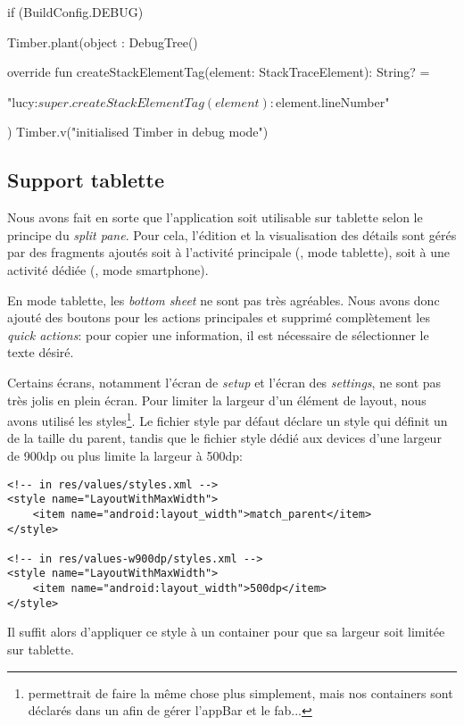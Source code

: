 \begin{kotlincode}
if (BuildConfig.DEBUG) {
    Timber.plant(object : DebugTree() {
        override fun createStackElementTag(element: StackTraceElement): String? =

        "lucy:${super.createStackElementTag(element)}:${element.lineNumber}"
    })
    Timber.v("initialised Timber in debug mode")
}
\end{kotlincode}    

\subsection{Support tablette}

Nous avons fait en sorte que l'application soit utilisable sur tablette selon le principe du \emph{split pane}. Pour cela, l'édition et la visualisation des détails sont gérés par des fragments ajoutés soit à l'activité principale (, mode tablette), soit à une activité dédiée (, mode smartphone). 

En mode tablette, les \emph{bottom sheet} ne sont pas très agréables. Nous avons donc ajouté des boutons pour les actions principales et supprimé complètement les \emph{quick actions}: pour copier une information, il est nécessaire de sélectionner le texte désiré. 

Certains écrans, notamment l'écran de \emph{setup} et l'écran des \emph{settings}, ne sont pas très jolis en plein écran. Pour limiter la largeur d'un élément de layout, nous avons utilisé les styles\footnote{ permettrait de faire la même chose plus simplement, mais nos containers sont déclarés dans un  afin de gérer l'appBar et le fab...}. Le fichier style par défaut déclare un style  qui définit un  de la taille du parent, tandis que le fichier style dédié aux devices d'une largeur de 900dp ou plus limite la largeur à 500dp:

\begin{verbatim}
<!-- in res/values/styles.xml -->
<style name="LayoutWithMaxWidth">
    <item name="android:layout_width">match_parent</item>
</style>

<!-- in res/values-w900dp/styles.xml -->
<style name="LayoutWithMaxWidth">
    <item name="android:layout_width">500dp</item>
</style>
\end{verbatim}

Il suffit alors d'appliquer ce style à un container pour que sa largeur soit limitée sur tablette.

